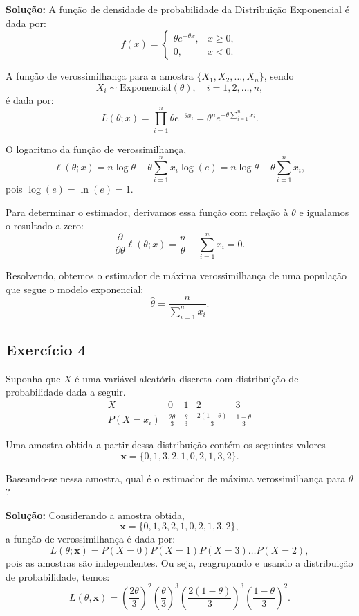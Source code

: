 \documentclass{article}
\begin{document}
\vspace{0.5cm}
\textbf{Solução:} 
A função de densidade de probabilidade da Distribuição Exponencial é dada por:
    $$
    f(x) = 
    \begin{cases}
    \theta e^{-\theta x}, & x \geq 0,\\
    0, & x < 0.
    \end{cases}
    $$
    
A função de verossimilhança para a amostra $\{X_1, X_2, \ldots, X_n\}$, sendo
    $$
    X_i \sim \text{Exponencial}(\theta), \quad i=1,2,\ldots,n,
    $$    
é dada por:
    $$
    L(\theta; x) = \prod_{i=1}^n \theta e^{-\theta x_i} 
    = \theta^n e^{-\theta \sum_{i=1}^n x_i}.
    $$

O logaritmo da função de verossimilhança,
    $$
    \ell(\theta; x) 
    = n \log \theta - \theta \sum_{i=1}^n x_i \log(e)
    = n \log \theta - \theta \sum_{i=1}^n x_i,
    $$
pois $\log(e) = \ln(e) = 1$.

Para determinar o estimador, derivamos essa função com relação à $\theta$ e igualamos o resultado a zero:
    $$
    \frac{\partial}{\partial \theta} \ell(\theta; x) 
    = \frac{n}{\theta} - \sum_{i=1}^n x_i = 0.
    $$
    
Resolvendo, obtemos o estimador de máxima verossimilhança de uma população que segue o modelo exponencial:
    $$
    \hat{\theta} 
    = \frac{n}{\sum_{i=1}^n x_i}.
    $$
    
\subsection{Exercício 4}
Suponha que $X$ é uma variável aleatória discreta com distribuição de probabilidade dada a seguir.
    $$
    \begin{array}{c|cccc}
    X & 0 & 1 & 2 & 3 \\ \hline
    P(X = x_i) & \frac{2\theta}{3} & \frac{\theta}{3} & \frac{2(1-\theta)}{3} & \frac{1-\theta}{3}
    \end{array}
    $$

Uma amostra obtida a partir dessa distribuição contém os seguintes valores 
    $$
    \mathbf{x} = \{0, 1, 3, 2, 1, 0, 2, 1, 3, 2\}.
    $$

Baseando-se nessa amostra, qual é o estimador de máxima verossimilhança para $\theta$?

\vspace{0.5cm}
\textbf{Solução:} 
Considerando a amostra obtida, 
    $$
    \mathbf{x} = \{0, 1, 3, 2, 1, 0, 2, 1, 3, 2\},
    $$
a função de verossimilhança é dada por:
    $$
    L(\theta; \mathbf{x}) = P(X = 0) P(X = 1) P(X = 3) \dots P(X = 2),
    $$
pois as amostras são independentes. Ou seja, reagrupando e usando a distribuição de probabilidade, temos:
    $$
    L(\theta, \mathbf{x}) = 
    \left(\frac{2\theta}{3}\right)^2 
    \left(\frac{\theta}{3}\right)^3 
    \left(\frac{2(1-\theta)}{3}\right)^3
    \left(\frac{1-\theta}{3}\right)^2.
    $$
\end{document}
